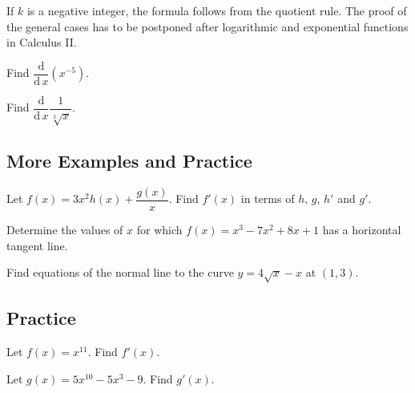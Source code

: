 If \(k\) is a negative integer, the formula follows from the quotient
rule. The proof of the general cases has to be postponed after
logarithmic and exponential functions in Calculus II.

\begin{example}
Find \(\dfrac{\mathrm{d}}{\mathrm{d}\,x}(x^{-5})\).
\end{example}
\vspace*{6\baselineskip}

\begin{example}
Find \(\dfrac{\mathrm{d}}{\mathrm{d}\,x}\dfrac{1}{\sqrt[3]{x}}\).
\end{example}
\vspace*{6\baselineskip}

\hypertarget{example-and-practice-on-differentiation-rules}{%
\subsection{More Examples and Practice}\label{example-and-practice-on-differentiation-rules}}

\begin{example}
Let \(f(x)=3x^2h(x)+\dfrac{g(x)}{x}\). Find \(f'(x)\) in terms of \(h\),
\(g\), \(h'\) and \(g'\).
\end{example}
\vspace*{6\baselineskip}

\begin{example}
Determine the values of \(x\) for which \(f(x)=x^3-7x^2+8x+1\) has a
horizontal tangent line.
\end{example}
\vspace*{6\baselineskip}

\begin{example}
Find equations of the normal line to the curve \(y=4\sqrt{x}-x\) at
\((1,3)\).
\end{example}
\vspace*{6\baselineskip}

\subsection{Practice}

\begin{exercise}
  Let \(f(x)=x^{11}\). Find \(f'(x)\).
  \end{exercise}
  \vspace*{6\baselineskip}
  
\begin{exercise}
Let \(g(x)=5x^{10}-5x^3-9\). Find \(g'(x)\).
\end{exercise}
\vspace*{6\baselineskip}

